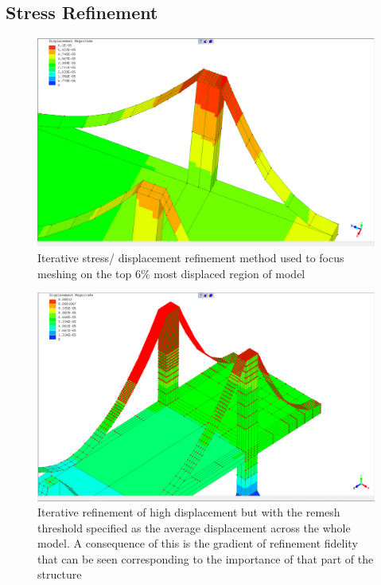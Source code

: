 \subsection{Stress Refinement}
\begin{figure}[!h]
  \centerline{\includegraphics[width=165mm, scale=0.5]{../Graphics/BridgeCrossLoading/the90thPercentileRefinement.png}}
  \caption{Iterative stress/ displacement refinement method used to focus meshing on the top 6\% most displaced region of model}
\end{figure}

\begin{figure}
  \centerline{\includegraphics[width=165mm, scale=0.5]{../Graphics/BridgeCrossLoading/aboveAverageRefinement2.png}}
  \caption{Iterative refinement of high displacement but with the remesh threshold specified as the average displacement across the whole model. A consequence of this is the gradient of refinement fidelity that can be seen corresponding to the importance of that part of the structure}
\end{figure}


